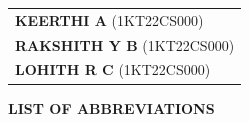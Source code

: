 \documentclass[12pt,a4paper,oneside]{report}
\begin{document}
\vspace{1.2cm}
\noindent
\begin{tabular}{l}
\textbf{KEERTHI A} (1KT22CS000) \\[0.3cm]
\textbf{RAKSHITH Y B} (1KT22CS000) \\[0.3cm]
\textbf{LOHITH R C} (1KT22CS000) \\[0.3cm]
\end{tabular}

\newpage
\tableofcontents

\newpage
\listoffigures

\newpage
\listoftables

\newpage
\thispagestyle{plain}
\begin{center}
\textbf{\fontsize{16}{19}\selectfont LIST OF ABBREVIATIONS}\\[0.8cm]
\end{center}
\end{document}
